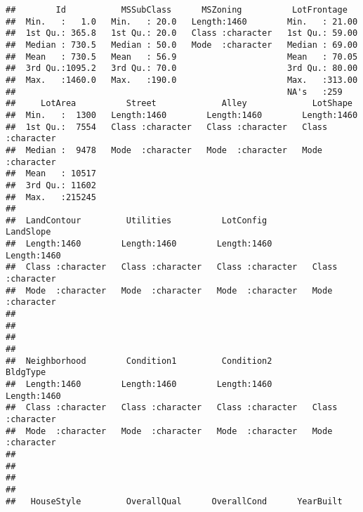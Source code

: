\documentclass[
]{article}
\begin{document}
\begin{verbatim}
##        Id           MSSubClass      MSZoning          LotFrontage    
##  Min.   :   1.0   Min.   : 20.0   Length:1460        Min.   : 21.00  
##  1st Qu.: 365.8   1st Qu.: 20.0   Class :character   1st Qu.: 59.00  
##  Median : 730.5   Median : 50.0   Mode  :character   Median : 69.00  
##  Mean   : 730.5   Mean   : 56.9                      Mean   : 70.05  
##  3rd Qu.:1095.2   3rd Qu.: 70.0                      3rd Qu.: 80.00  
##  Max.   :1460.0   Max.   :190.0                      Max.   :313.00  
##                                                      NA's   :259     
##     LotArea          Street             Alley             LotShape        
##  Min.   :  1300   Length:1460        Length:1460        Length:1460       
##  1st Qu.:  7554   Class :character   Class :character   Class :character  
##  Median :  9478   Mode  :character   Mode  :character   Mode  :character  
##  Mean   : 10517                                                           
##  3rd Qu.: 11602                                                           
##  Max.   :215245                                                           
##                                                                           
##  LandContour         Utilities          LotConfig          LandSlope        
##  Length:1460        Length:1460        Length:1460        Length:1460       
##  Class :character   Class :character   Class :character   Class :character  
##  Mode  :character   Mode  :character   Mode  :character   Mode  :character  
##                                                                             
##                                                                             
##                                                                             
##                                                                             
##  Neighborhood        Condition1         Condition2          BldgType        
##  Length:1460        Length:1460        Length:1460        Length:1460       
##  Class :character   Class :character   Class :character   Class :character  
##  Mode  :character   Mode  :character   Mode  :character   Mode  :character  
##                                                                             
##                                                                             
##                                                                             
##                                                                             
##   HouseStyle         OverallQual      OverallCond      YearBuilt   

\end{verbatim}
\end{document}
